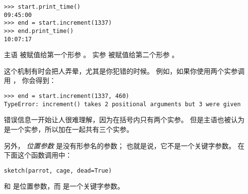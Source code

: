 \begin{lstlisting}
>>> start.print_time()
09:45:00
>>> end = start.increment(1337)
>>> end.print_time()
10:07:17
\end{lstlisting}

%

主语  被赋值给第一个形参 。  
实参  被赋值给第二个形参  。


这个机制有时会把人弄晕，尤其是你犯错的时候。  
例如，如果你使用两个实参调用 ， 你会得到：
  

\begin{lstlisting}
>>> end = start.increment(1337, 460)
TypeError: increment() takes 2 positional arguments but 3 were given
\end{lstlisting}

%

错误信息一开始让人很难理解，因为在括号内只有两个实参。  
但是主语也被认为是一个实参，所以加在一起共有三个实参。  

另外， {\em 位置参数} 是没有形参名的参数； 也就是说，它不是一个关键字参数。  
在下面这个函数调用中：
  

\begin{lstlisting}
sketch(parrot, cage, dead=True)
\end{lstlisting}


 和  是位置参数，而  是一个关键字参数。

